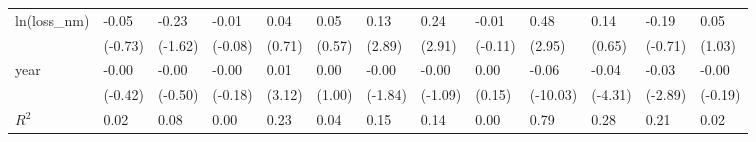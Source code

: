 \begin{tabular}{p{1.5cm} p{1.7cm} p{1.7cm} p{1.7cm}  p{1.7cm} p{1.7cm} p{1.7cm} p{1.7cm} p{1.7cm}  p{1.7cm} p{1.7cm} p{1.7cm} p{1.7cm} }
\hline
ln(loss\_nm)     &    -0.05         &    -0.23         &    -0.01         &     0.04         &     0.05         &     0.13\sym{**} &     0.24\sym{**} &    -0.01         &     0.48\sym{**} &     0.14         &    -0.19         &     0.05         \\
                &  (-0.73)         &  (-1.62)         &  (-0.08)         &   (0.71)         &   (0.57)         &   (2.89)         &   (2.91)         &  (-0.11)         &   (2.95)         &   (0.65)         &  (-0.71)         &   (1.03)         \\
year            &    -0.00         &    -0.00         &    -0.00         &     0.01\sym{**} &     0.00         &    -0.00         &    -0.00         &     0.00         &    -0.06\sym{***}&    -0.04\sym{***}&    -0.03\sym{**} &    -0.00         \\
                &  (-0.42)         &  (-0.50)         &  (-0.18)         &   (3.12)         &   (1.00)         &  (-1.84)         &  (-1.09)         &   (0.15)         & (-10.03)         &  (-4.31)         &  (-2.89)         &  (-0.19)         \\
\hline
\(R^{2}\)       &     0.02         &     0.08         &     0.00         &     0.23         &     0.04         &     0.15         &     0.14         &     0.00         &     0.79         &     0.28         &     0.21         &     0.02         \\
\end{tabular}
